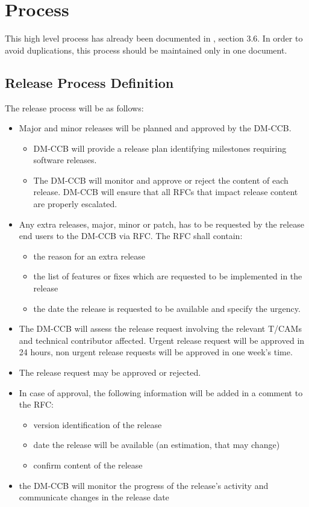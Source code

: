 \section{Process} \label{sec:process}


This high level process has already been documented in , section 3.6. 
In order to avoid duplications, this process should be maintained only in one document.


\subsection{Release Process Definition}

The release process will be as follows:

\begin{itemize}
\item Major and minor releases will be planned and approved by the DM-CCB.
\begin{itemize}
  \item  DM-CCB will provide  a release plan identifying  milestones requiring software releases.
  \item The DM-CCB will monitor and approve or reject the content of each release. DM-CCB will ensure that  all RFCs that impact  release content are properly escalated.
\end{itemize}
\item Any extra releases, major, minor or patch, has to be requested by the release end users to the DM-CCB via \gls{RFC}. The \gls{RFC} shall contain:
\begin{itemize}
  \item the reason for an extra release
  \item the list of features or fixes which are requested to be implemented in the release
  \item the date the release is requested to be available and specify the urgency.
\end{itemize}
\item The DM-CCB will assess the release request involving the relevant T/CAMs and technical contributor affected.
Urgent release request will be approved in 24 hours, non urgent release requests will be approved in one week's time.
\item The release request may be approved or rejected.
\item In case of approval, the following information will be added in a comment to the RFC:
\begin{itemize}
  \item version identification of the release
  \item date the release will be available (an estimation, that may change)
  \item confirm content of the release
\end{itemize}
\item the DM-CCB will monitor the progress of the release's activity and communicate changes in the release date
\end{itemize}


